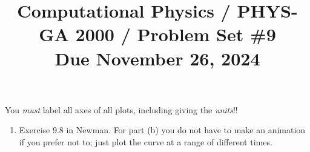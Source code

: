 \documentclass[11pt, preprint]{aastex}
\begin{document}
\title{\bf Computational Physics / PHYS-GA 2000 / Problem Set \#9
\\ Due November 26, 2024 }

You {\it must} label all axes of all plots, including giving the {\it
  units}!!

\begin{enumerate} 
\item Exercise 9.8 in Newman. For part (b) you do not have to make an
  animation if you prefer not to; just plot the curve at a range of
  different times.
\end{enumerate} 
\end{document}
